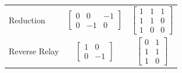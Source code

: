 \documentclass[sigconf,review,anonymous]{acmart}
\begin{document}
\begin{table}[H]
\begin{tabular}{@{}lcc@{}}
Reduction &
$\begin{bmatrix} 0 & 0 & -1 \\ 0 & -1 & 0 \end{bmatrix}$ &
$\begin{bmatrix} 1 & 1 & 1 \\ 1 & 1 & 0 \\ 1 & 0 & 0 \end{bmatrix}$ \\[12pt]

Reverse Relay &
$\begin{bmatrix} 1 & 0 \\ 0 & -1 \end{bmatrix}$ &
$\begin{bmatrix} 0 & 1 \\ 1 & 1 \\ 1 & 0 \end{bmatrix}$ \\
\bottomrule
\end{tabular}
\end{table}
\end{document}
